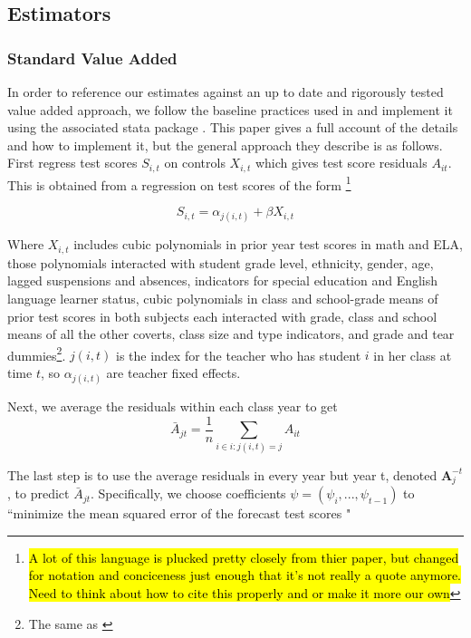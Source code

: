 \documentclass[12pt]{article}
\theoremstyle{definition}
\theoremstyle{definition}
\theoremstyle{definition}
\theoremstyle{definition}
\begin{document}
    \subsection{Estimators}
    \subsubsection{Standard Value Added}

    In order to reference our estimates against an up to date and rigorously tested value added approach, we follow the baseline practices used in \citet{chetty2014measuring1} and implement it using the associated stata package \citep{vam_stata_ado}. This paper gives a full account of the details and how to implement it, but the general approach they describe is as follows. First regress test scores $S_{i,t}$ on controls $X_{i, t}$ which gives test score residuals $A_{it}$. This is obtained from a regression on test scores of the form \footnote{\hl{A lot of this language is plucked pretty closely from thier paper, but changed for notation and conciceness just enough that it's not really a quote anymore. Need to think about how to cite this properly and or make it more our own}}

    \begin{equation}
        S_{i,t} = \alpha_{j(i, t)} + \beta X_{i, t}
    \end{equation}

    Where $X_{i, t}$ includes cubic polynomials in prior year test scores in math and ELA, those polynomials interacted with student grade level, ethnicity, gender, age, lagged suspensions and absences, indicators for special education and English language learner status, cubic polynomials in class and school-grade means of prior test scores in both subjects each interacted with grade, class and school means of all the other coverts, class size and type indicators, and grade and tear dummies\footnote{The same as \citep{chetty2014measuring1}}. $j(i, t)$ is the index for the teacher who has student $i$ in her class at time $t$, so $\alpha_{j(i, t)}$ are teacher fixed effects.

    Next, we average the residuals within each class year to get 
    \begin{equation}
        \bar{A}_{jt} = \frac{1}{n} \sum_{i \in {i: j(i, t) = j}} A_{it}
    \end{equation}

    The last step is to use the average residuals in every year but year t, denoted $\mathbf{A}_j^{-t}$, to predict $\bar{A}_{jt} $. Specifically, we choose coefficients $\psi = (\psi_i, ..., \psi_{t-1})$ to ``minimize the mean squared error of the forecast test scores \citep{chetty2014measuring1}"
\end{document}
